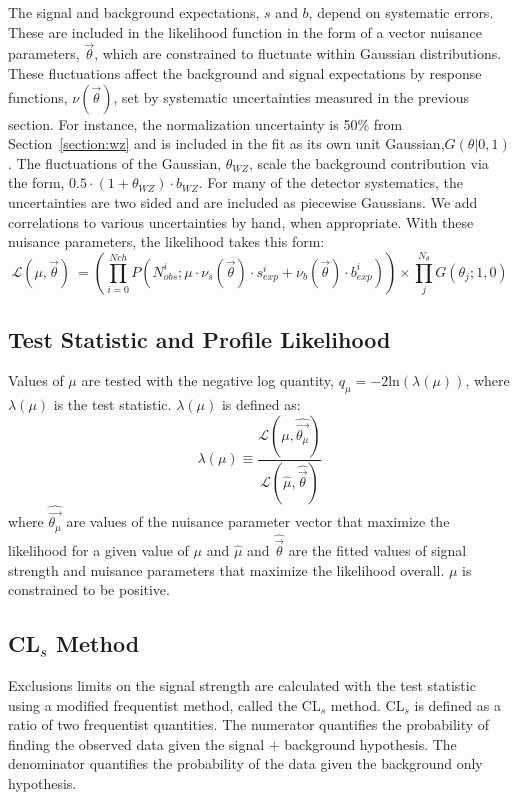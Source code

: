 The signal and background expectations, $s$ and $b$, depend on systematic errors. These are included in the likelihood function in the form of a vector nuisance parameters, $\vec{\theta}$, which are constrained to fluctuate within Gaussian distributions. These fluctuations affect the background and signal expectations by response functions, $\nu(\vec{\theta})$, set by systematic uncertainties measured in the previous section. For instance, the \WZ normalization uncertainty is 50\% from Section~\ref{section:wz} and is included in the fit as its own unit Gaussian,$G(\theta|0,1)$. The fluctuations of the Gaussian, $\theta_{WZ}$, scale the background contribution via the form, $0.5\cdot(1+\theta_{WZ})\cdot b_{WZ}$. For many of the detector systematics, the uncertainties are two sided and are included as piecewise Gaussians. We add correlations to various uncertainties by hand, when appropriate. With these nuisance parameters, the likelihood takes this form:
\begin{equation}
\mathcal{L}(\mu,\vec{\theta})\ =  \left( \prod_{i=0}^{N{ch}} P(N_{obs}^{i}; \mu \cdot \nu_{s}(\vec{\theta})\cdot s_{exp}^{i} + \nu_{b}(\vec{\theta})\cdot b_{exp}^{i}) \right) \times \prod_{j}^{N_{\theta}}G(\theta_j; 1,0)
\end{equation}


\subsection{Test Statistic and Profile Likelihood}

Values of $\mu$ are tested with the negative log quantity, $q_{\mu}= -2$ln$(\lambda(\mu))$, where $\lambda(\mu)$ is the test statistic.
$\lambda(\mu)$ is defined as:
\begin{equation}
\lambda(\mu) \equiv \frac{\mathcal{L}(\mu,\hat{\vec{\theta_{\mu}}})}{\mathcal{L}(\hat{\mu},\hat{\vec{\theta}})}
\end{equation}
where $\hat{\vec{\theta_{\mu}}}$ are values of the nuisance parameter vector that maximize the likelihood for a given value of $\mu$ and $\hat{\mu}$ and $\hat{\vec{\theta}}$ are the fitted values of signal strength and nuisance parameters that maximize the likelihood overall. $\mu$ is constrained to be positive.  

\subsection{ CL$_{s}$ Method}

Exclusions limits on the signal strength are calculated with the test statistic using a modified frequentist method, called the CL$_{s}$ method\cite{0954-3899-28-10-313}. CL$_{s}$ is defined as a ratio of two frequentist quantities. The numerator quantifies the probability of finding the observed data given the signal $+$ background hypothesis. The denominator quantifies the probability of the data given the background only hypothesis.

